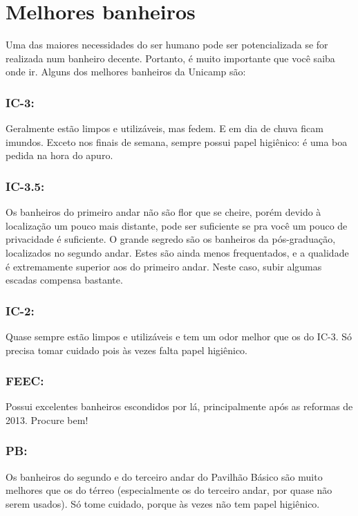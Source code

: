 
\section{Melhores banheiros}

Uma das maiores necessidades do ser humano pode ser potencializada se for
realizada num banheiro decente. Portanto, é muito importante que você saiba
onde ir. Alguns dos melhores banheiros da Unicamp são:

\subsubsection{IC-3:} Geralmente estão limpos e utilizáveis, mas fedem. E em
dia de chuva ficam imundos. Exceto nos finais de semana, sempre possui papel
higiênico: é uma boa pedida na hora do apuro.

\subsubsection{IC-3.5:} Os banheiros do primeiro andar não são flor que se
cheire, porém devido à localização um pouco mais distante, pode ser suficiente
se pra você um pouco de privacidade é suficiente. O grande segredo são os
banheiros da pós-graduação, localizados no segundo andar. Estes são ainda menos
frequentados, e a qualidade é extremamente superior aos do primeiro andar.
Neste caso, subir algumas escadas compensa bastante.

\subsubsection{IC-2:} Quase sempre estão limpos e utilizáveis e tem um odor
melhor que os do IC-3. Só precisa tomar cuidado pois às vezes falta papel
higiênico.

\subsubsection{FEEC:} Possui excelentes banheiros escondidos por lá,
principalmente após as reformas de 2013. Procure bem!

\subsubsection{PB:} Os banheiros do segundo e do terceiro andar do Pavilhão
Básico são muito melhores que os do térreo (especialmente os do terceiro andar,
por quase não serem usados). Só tome cuidado, porque às vezes não tem papel
higiênico.


